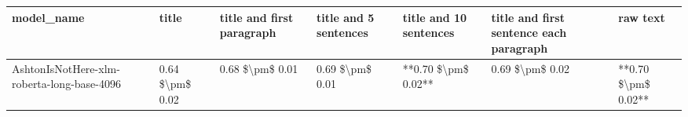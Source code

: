 \begin{tabular}{lllllll}
\toprule
                                model\_name &           title & title and first paragraph & title and 5 sentences & title and 10 sentences & title and first sentence each paragraph &            raw text \\
\midrule
AshtonIsNotHere-xlm-roberta-long-base-4096 & 0.64 \$\textbackslash pm\$ 0.02 &           0.68 \$\textbackslash pm\$ 0.01 &       0.69 \$\textbackslash pm\$ 0.01 &    **0.70 \$\textbackslash pm\$ 0.02** &                         0.69 \$\textbackslash pm\$ 0.02 & **0.70 \$\textbackslash pm\$ 0.02** \\
\bottomrule
\end{tabular}
